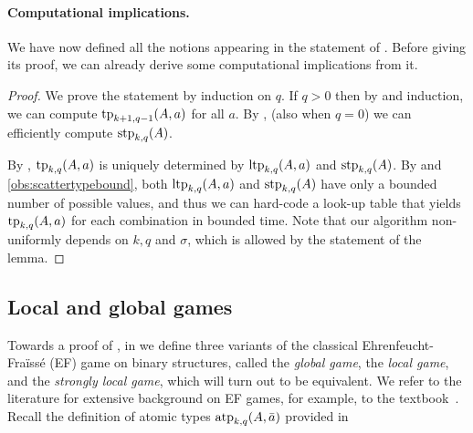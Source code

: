 \paragraph{Computational implications.}
We have now defined all the notions appearing in the statement of .
Before giving its proof,
we can already derive some computational implications from it.

\localglobaltypes*
\begin{proof}
    We prove the statement by induction on \(q\).
    If $q>0$ then by  and induction, we can compute \(\textnormal{tp}_{k+1,q-1}(A,a)\) for all \(a\).
    By , (also when $q= 0$) we can efficiently compute \(\textnormal{stp}_{k,q}(A)\).

    By , \(\textnormal{tp}_{k,q}(A,a)\) is uniquely determined by
    \(\textnormal{ltp}_{k,q}(A,a)\) and \(\textnormal{stp}_{k,q}(A)\).
    By  and \ref{obs:scattertypebound},
    both \(\textnormal{ltp}_{k,q}(A,a)\) and \(\textnormal{stp}_{k,q}(A)\)
    have only a bounded number of possible values,
    and thus we can hard-code a look-up table that yields \(\textnormal{tp}_{k,q}(A,a)\)
    for each combination in bounded time.
    Note that our algorithm non-uniformly depends on \(k,q\) and \(\sigma\), which is allowed by the statement of the lemma.
\end{proof}


\subsection{Local and global games}\label{sec:localglobalgame}
Towards a proof of , in  we define three variants of the classical Ehrenfeucht-Fraïssé (EF) game on binary structures,
called the \emph{global game}, the \emph{local game}, and the \emph{strongly local game},
which will turn out to be equivalent.
We refer to the literature for extensive background on EF games, for example, to the textbook~\cite{libkin04}.
Recall the definition of atomic types \(\textnormal{atp}_{k,q}(A,\bar a)\) provided in 


